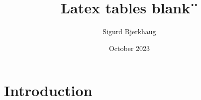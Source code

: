 \documentclass{article}
\title{Latex tables blank¨}
\author{Sigurd Bjerkhaug}
\date{October 2023}
\begin{document}
\maketitle

\newpage
\section{Introduction}


\begin{landscape}








\end{landscape}
\end{document}
